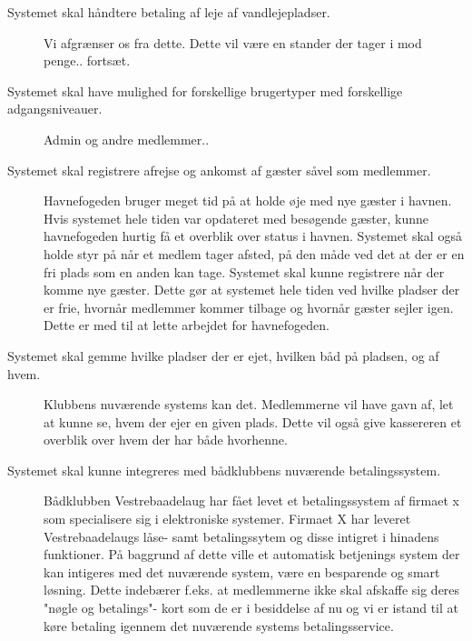 \begin{description} 
  \item[Systemet skal håndtere betaling af leje af vandlejepladser.]

  Vi afgrænser os fra dette. Dette vil være en stander der tager i mod penge.. fortsæt. 

  \item[Systemet skal have mulighed for forskellige brugertyper med forskellige adgangsniveauer.]

    Admin og andre medlemmer..
  \item[Systemet skal registrere afrejse og ankomst af gæster såvel som medlemmer.] \hfill 


  Havnefogeden bruger meget tid på at holde øje med nye gæster i havnen. Hvis systemet hele tiden var opdateret med besøgende gæster, kunne havnefogeden hurtig få et overblik over status i havnen. Systemet skal også holde styr på når et medlem tager afsted, på den måde ved det at der er en fri plads som en anden kan tage. Systemet skal kunne registrere når der komme nye gæster. Dette gør at systemet hele tiden ved hvilke pladser der er frie, hvornår medlemmer kommer tilbage og hvornår gæster sejler igen. Dette er med til at lette arbejdet for havnefogeden.

  \item[Systemet skal gemme hvilke pladser der er ejet, hvilken båd på pladsen, og af hvem.]

  Klubbens nuværende systems kan det. Medlemmerne vil have gavn af, let at kunne se, hvem der ejer en given plads. Dette vil også give kassereren et overblik over hvem der har både hvorhenne.

  \item[Systemet skal kunne integreres med bådklubbens nuværende betalingssystem.]
  
  
 Bådklubben Vestrebaadelaug har fået levet et betalingssystem af firmaet x som specialisere sig i elektroniske systemer. Firmaet X har leveret Vestrebaadelaugs
låse- samt betalingssytem og disse intigret i hinadens funktioner. På baggrund af dette ville et automatisk betjenings system der kan intigeres med det nuværende
system, være en besparende og smart løsning. Dette indebærer f.eks. at medlemmerne ikke skal afskaffe sig deres "nøgle og betalings"- kort som de er i besiddelse af nu og
vi er istand til at køre betaling igennem det nuværende systems betalingsservice. 


\end{description}

